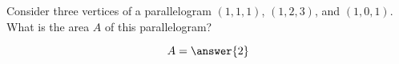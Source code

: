 \documentclass{ximera}
\author{Gregory Hartman \and Matthew Carr}
\begin{document}
\begin{exercise}



Consider three vertices of a parallelogram $(1,1,1)$, $(1,2,3)$, and $(1,0,1)$. What is the area $A$ of this parallelogram?

\begin{prompt}
\[
A=\answer{2}
\]
\end{prompt}


\end{exercise}
\end{document}
